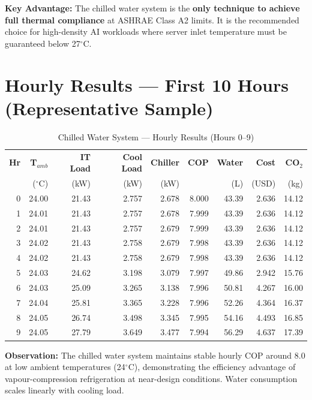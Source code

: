 \documentclass[12pt,a4paper]{report}
\newcommand{\degC}{$^{\circ}$C}
\begin{document}
\noindent\textbf{Key Advantage:} The chilled water system is the \textbf{only technique to achieve
full thermal compliance} at ASHRAE Class A2 limits. It is the recommended choice for high-density
AI workloads where server inlet temperature must be guaranteed below 27\degC.

\section{Hourly Results --- First 10 Hours (Representative Sample)}

\begin{table}[H]
\centering
\caption{Chilled Water System --- Hourly Results (Hours 0--9)}
\label{tab:chw_hourly}
\renewcommand{\arraystretch}{1.2}
\scriptsize
\begin{tabular}{rrrrrrrrr}
\toprule
\textbf{Hr} & \textbf{T$_{amb}$} & \textbf{IT Load} & \textbf{Cool Load} & \textbf{Chiller} & \textbf{COP} & \textbf{Water} & \textbf{Cost} & \textbf{CO$_2$} \\
 & (\degC) & (kW) & (kW) & (kW) & & (L) & (USD) & (kg) \\
\midrule
0 & 24.00 & 21.43 & 2.757 & 2.678 & 8.000 & 43.39 & 2.636 & 14.12 \\
1 & 24.01 & 21.43 & 2.757 & 2.678 & 7.999 & 43.39 & 2.636 & 14.12 \\
2 & 24.01 & 21.43 & 2.757 & 2.679 & 7.999 & 43.39 & 2.636 & 14.12 \\
3 & 24.02 & 21.43 & 2.758 & 2.679 & 7.998 & 43.39 & 2.636 & 14.12 \\
4 & 24.02 & 21.43 & 2.758 & 2.679 & 7.998 & 43.39 & 2.636 & 14.12 \\
5 & 24.03 & 24.62 & 3.198 & 3.079 & 7.997 & 49.86 & 2.942 & 15.76 \\
6 & 24.03 & 25.09 & 3.265 & 3.138 & 7.996 & 50.81 & 4.267 & 16.00 \\
7 & 24.04 & 25.81 & 3.365 & 3.228 & 7.996 & 52.26 & 4.364 & 16.37 \\
8 & 24.05 & 26.74 & 3.498 & 3.345 & 7.995 & 54.16 & 4.493 & 16.85 \\
9 & 24.05 & 27.79 & 3.649 & 3.477 & 7.994 & 56.29 & 4.637 & 17.39 \\
\bottomrule
\end{tabular}
\end{table}

\noindent\textbf{Observation:} The chilled water system maintains stable hourly COP around 8.0 at
low ambient temperatures (24\degC), demonstrating the efficiency advantage of vapour-compression
refrigeration at near-design conditions. Water consumption scales linearly with cooling load.
\end{document}
